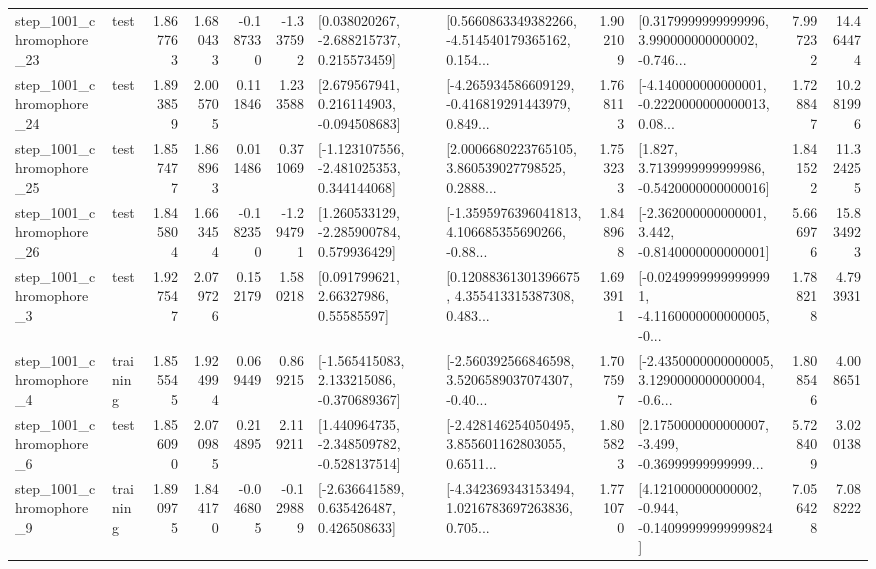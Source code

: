 \begin{tabular}{llrrrrllrlrr}
 step\_1001\_chromophore\_23 &      test &      1.867763 &    1.680433 &     -0.187330 & -1.337592 &    [0.038020267, -2.688215737, 0.215573459] &  [0.5660863349382266, -4.514540179365162, 0.154... &       1.902109 &  [0.3179999999999996, 3.990000000000002, -0.746... &            7.997232 &         14.464474 \\
 step\_1001\_chromophore\_24 &      test &      1.893859 &    2.005705 &      0.111846 &  1.233588 &    [2.679567941, 0.216114903, -0.094508683] &  [-4.265934586609129, -0.416819291443979, 0.849... &       1.768113 &  [-4.140000000000001, -0.2220000000000013, 0.08... &            1.728847 &         10.281996 \\
 step\_1001\_chromophore\_25 &      test &      1.857477 &    1.868963 &      0.011486 &  0.371069 &   [-1.123107556, -2.481025353, 0.344144068] &  [2.0006680223765105, 3.860539027798525, 0.2888... &       1.753233 &   [1.827, 3.7139999999999986, -0.5420000000000016] &            1.841522 &         11.324255 \\
 step\_1001\_chromophore\_26 &      test &      1.845804 &    1.663454 &     -0.182350 & -1.294791 &    [1.260533129, -2.285900784, 0.579936429] &  [-1.3595976396041813, 4.106685355690266, -0.88... &       1.848968 &   [-2.362000000000001, 3.442, -0.8140000000000001] &            5.666976 &         15.834923 \\
  step\_1001\_chromophore\_3 &      test &      1.927547 &    2.079726 &      0.152179 &  1.580218 &       [0.091799621, 2.66327986, 0.55585597] &  [0.12088361301396675, 4.355413315387308, 0.483... &       1.693911 &  [-0.02499999999999991, -4.1160000000000005, -0... &            1.788218 &          4.793931 \\
  step\_1001\_chromophore\_4 &  training &      1.855545 &    1.924994 &      0.069449 &  0.869215 &   [-1.565415083, 2.133215086, -0.370689367] &  [-2.560392566846598, 3.5206589037074307, -0.40... &       1.707597 &  [-2.4350000000000005, 3.1290000000000004, -0.6... &            1.808546 &          4.008651 \\
  step\_1001\_chromophore\_6 &      test &      1.856090 &    2.070985 &      0.214895 &  2.119211 &   [1.440964735, -2.348509782, -0.528137514] &  [-2.428146254050495, 3.855601162803055, 0.6511... &       1.805823 &  [2.1750000000000007, -3.499, -0.36999999999999... &            5.728409 &          3.020138 \\
  step\_1001\_chromophore\_9 &  training &      1.890975 &    1.844170 &     -0.046805 & -0.129889 &    [-2.636641589, 0.635426487, 0.426508633] &  [-4.342369343153494, 1.0216783697263836, 0.705... &       1.771070 &  [4.121000000000002, -0.944, -0.14099999999999824] &            7.056428 &          7.088222 \\

\end{tabular}

